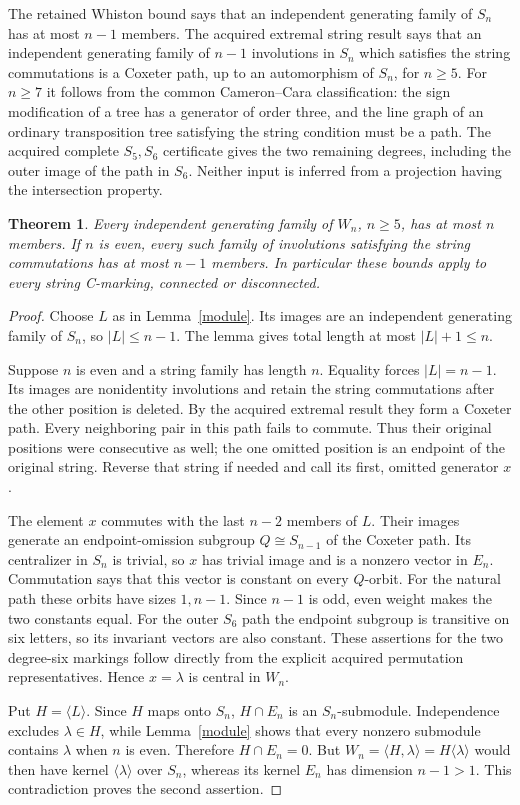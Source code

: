\documentclass[11pt,a4paper]{article}
\newtheorem{theorem}[lemma]{Theorem}
\newcommand{\gen}[1]{\langle#1\rangle}
\begin{document}
The retained Whiston bound says that an independent generating family
of $S_n$ has at most $n-1$ members. The acquired extremal string result
says that an independent generating family of $n-1$ involutions in
$S_n$ which satisfies the string commutations is a Coxeter path, up to
an automorphism of $S_n$, for $n\ge5$. For $n\ge7$ it follows from the
common Cameron--Cara classification: the sign modification of a tree
has a generator of order three, and the line graph of an ordinary
transposition tree satisfying the string condition must be a path.
The acquired complete $S_5,S_6$ certificate gives the two remaining
degrees, including the outer image of the path in $S_6$.
Neither input is inferred from a projection having the intersection property.

\begin{theorem}\label{bound}
Every independent generating family of $W_n$, $n\ge5$, has at most $n$
members. If $n$ is even, every such family of involutions satisfying
the string commutations has at most $n-1$ members.
In particular these bounds apply to every string C-marking, connected
or disconnected.
\end{theorem}
\begin{proof}
Choose $L$ as in Lemma~\ref{module}. Its images are an independent
generating family of $S_n$, so $|L|\le n-1$. The lemma gives total
length at most $|L|+1\le n$.

Suppose $n$ is even and a string family has length $n$. Equality
forces $|L|=n-1$. Its images are nonidentity involutions and retain
the string commutations after the other position is deleted.
By the acquired extremal result they form a Coxeter path.
Every neighboring pair in this path fails to commute. Thus their
original positions were consecutive as well; the one omitted position
is an endpoint of the original string. Reverse that string if needed
and call its first, omitted generator $x$.

The element $x$ commutes with the last $n-2$ members of $L$.
Their images generate an endpoint-omission subgroup $Q\cong S_{n-1}$
of the Coxeter path. Its centralizer in $S_n$ is trivial, so $x$
has trivial image and is a nonzero vector in $E_n$. Commutation says
that this vector is constant on every $Q$-orbit. For the natural
path these orbits have sizes $1,n-1$. Since $n-1$ is odd, even weight
makes the two constants equal. For the outer $S_6$ path the endpoint
subgroup is transitive on six letters, so its invariant vectors are
also constant. These assertions for the two degree-six markings
follow directly from the explicit acquired permutation representatives.
Hence $x=\lambda$ is central in $W_n$.

Put $H=\gen L$. Since $H$ maps onto $S_n$, $H\cap E_n$ is an
$S_n$-submodule. Independence excludes $\lambda\in H$, while
Lemma~\ref{module} shows that every nonzero submodule contains
$\lambda$ when $n$ is even. Therefore $H\cap E_n=0$.
But $W_n=\gen{H,\lambda}=H\gen\lambda$ would then have kernel
$\gen\lambda$ over $S_n$, whereas its kernel $E_n$ has dimension
$n-1>1$. This contradiction proves the second assertion.
\end{proof}
\end{document}
